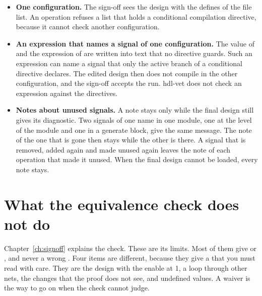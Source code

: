 \begin{itemize}
  One case stays open, one level further in. A signal declared inside a generate block is
  not counted, so a driver lost on such a signal is not reported.
\item \textbf{One configuration.} The sign-off sees the design with the defines of the
  file list. An operation refuses a list that holds a conditional compilation directive,
  because it cannot check another configuration.
\item \textbf{An expression that names a signal of one configuration.} The value of
   and the expression of  are
  written into text that no directive guards. Such an expression can name a signal that
  only the active branch of a conditional directive declares. The edited design then does
  not compile in the other configuration, and the sign-off accepts the run. hdl-vet does
  not check an expression against the directives.
\item \textbf{Notes about unused signals.} A note stays only while the final design still
  gives its diagnostic. Two signals of one name in one module, one at the level of the
  module and one in a generate block, give the same message. The note of the one that is
  gone then stays while the other is there. A signal that is removed, added again and made
  unused again leaves the note of each operation that made it unused. When the final design cannot be loaded, every note stays.
\end{itemize}






\section{What the equivalence check does not do}

Chapter~\ref{ch:signoff} explains the check. These are its limits. Most of them give
 or , and never a wrong . Four items are different,
because they give a  that you must read with care. They are the design with the
enable at 1, a loop through other nets, the changes that the proof does not see, and
undefined values. A waiver is the way to go on when the check cannot judge.

